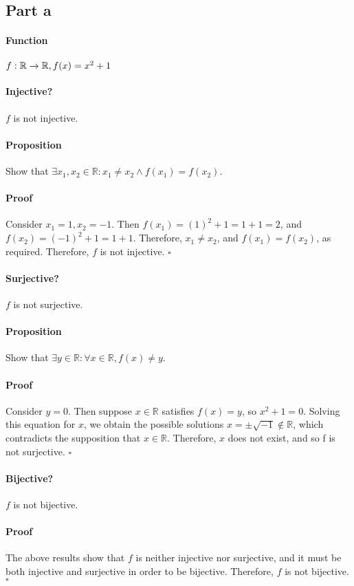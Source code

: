 \documentclass{article}
\begin{document}
\subsection{Part a}
{
\paragraph{Function}$f:\mathbb{R}\xrightarrow{}\mathbb{R}, f(x)=x^2+1$
{
\paragraph{Injective?}
$f$ is not injective.
\vspace{-10pt}
\paragraph{Proposition}
Show that $\exists x_1, x_2 \in \mathbb{R} : x_1 \neq x_2 \land f(x_1) = f(x_2)$.
\vspace{-10pt}
\paragraph{Proof}
Consider $x_1=1, x_2=-1$. Then $f(x_1)=(1)^2+1=1+1 = 2$, and $f(x_2)=(-1)^2+1=1+1$. Therefore, $x_1 \neq x_2$, and $f(x_1) = f(x_2)$, as required. Therefore, $f$ is not injective. $\square$
}
{
\paragraph{Surjective?}
$f$ is not surjective.
\vspace{-10pt}
\paragraph{Proposition}
Show that $\exists y \in \mathbb{R} : \forall x \in \mathbb{R}, f(x) \neq y$.
\vspace{-10pt}
\paragraph{Proof}
Consider $y=0$. Then suppose $x \in \mathbb{R}$ satisfies $f(x)=y$, so $x^2+1=0$. Solving this equation for $x$, we obtain the possible solutions $x=\pm\sqrt{-1} \notin \mathbb{R}$, which contradicts the supposition that $x \in \mathbb{R}$. Therefore, $x$ does not exist, and so f is not surjective. $\square$
}
{
\paragraph{Bijective?}
$f$ is not bijective.
\vspace{-10pt}
\paragraph{Proof}
The above results show that $f$ is neither injective nor surjective, and it must be both injective and surjective in order to be bijective. Therefore, $f$ is not bijective. $\square$
}
}
\end{document}
